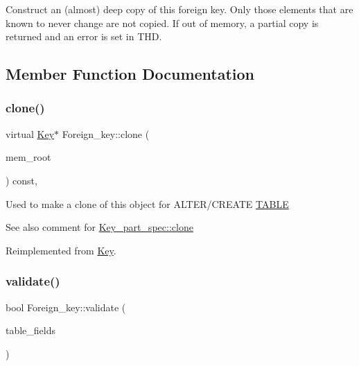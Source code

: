 Construct an (almost) deep copy of this foreign key. Only those elements that are known to never change are not copied. If out of memory, a partial copy is returned and an error is set in T\+HD. 

\subsection{Member Function Documentation}
\mbox{\label{classForeign__key_a6b95a958ac60355c961a0a173a439678}} 
\subsubsection{\texorpdfstring{clone()}{clone()}}
{\footnotesize\ttfamily virtual \mbox{\hyperlink{classKey}{Key}}$\ast$ Foreign\+\_\+key\+::clone (\begin{DoxyParamCaption}\item[{M\+E\+M\+\_\+\+R\+O\+OT $\ast$}]{mem\+\_\+root }\end{DoxyParamCaption}) const\hspace{0.3cm}{\ttfamily [inline]}, {\ttfamily [virtual]}}

Used to make a clone of this object for A\+L\+T\+E\+R/\+C\+R\+E\+A\+TE \mbox{\hyperlink{structTABLE}{T\+A\+B\+LE}} \begin{DoxySeeAlso}{See also}
comment for \mbox{\hyperlink{classKey__part__spec_adf40542629144b3dc70f9ae4b4b27c78}{Key\+\_\+part\+\_\+spec\+::clone}} 
\end{DoxySeeAlso}


Reimplemented from \mbox{\hyperlink{classKey_ac6f8cb767fc9dcee06fd80ca2350f43f}{Key}}.

\mbox{\label{classForeign__key_ab89c4b2272ed78736ac27b60d6dcbb19}} 
\subsubsection{\texorpdfstring{validate()}{validate()}}
{\footnotesize\ttfamily bool Foreign\+\_\+key\+::validate (\begin{DoxyParamCaption}\item[{\mbox{\hyperlink{classList}{List}}$<$ \mbox{\hyperlink{classCreate__field}{Create\+\_\+field}} $>$ \&}]{table\+\_\+fields }\end{DoxyParamCaption})}



